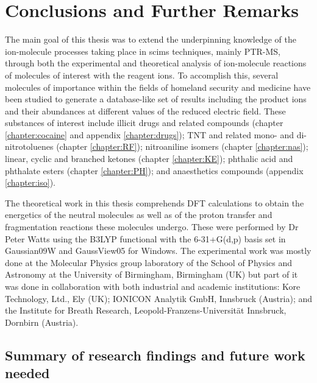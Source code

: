 \chapter{Conclusions and Further Remarks}\label{chapter:conclusions}

The main goal of this thesis was to extend the underpinning knowledge of the ion-molecule processes taking place in \acrshort{scims} techniques, mainly PTR-MS, through both the experimental and theoretical analysis of ion-molecule reactions of molecules of interest with the reagent ions. %
%
To accomplish this, several molecules of importance within the fields of homeland security and medicine have been studied to generate a database-like set of results including the product ions and their abundances at different values of the reduced electric field.
%
These substances of interest include  illicit drugs and related compounds (chapter \ref{chapter:cocaine} and appendix \ref{chapter:drugs}); 
TNT and related mono- and di- nitrotoluenes  (chapter \ref{chapter:RF});
nitroaniline isomers  (chapter \ref{chapter:nas});
linear, cyclic and branched ketones  (chapter \ref{chapter:KE}); 
phthalic acid and phthalate esters  (chapter \ref{chapter:PH}); 
and 
anaesthetics compounds  (appendix \ref{chapter:iso}).



The theoretical work in this thesis comprehends DFT calculations to obtain the energetics of the neutral molecules as well as of the proton transfer and fragmentation reactions these molecules undergo.
%
These were performed by Dr Peter Watts using the B3LYP functional with the 6-31+G(d,p) basis set in Gaussian09W and GaussView05 for Windows.
%
The experimental work was mostly done at the  Molecular Physics group laboratory of the School of Physics and Astronomy at the University of Birmingham, Birmingham (UK)
but part of it was done in collaboration with both industrial and academic institutions: 
Kore Technology, Ltd.,  Ely (UK);
IONICON Analytik GmbH, Innsbruck (Austria);
and
the Institute for Breath Research, Leopold-Franzens-Universität Innsbruck, Dornbirn (Austria).


\section{Summary of research findings and future work needed}
